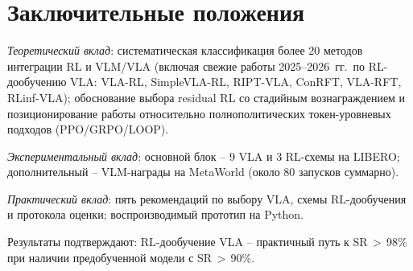 \section*{Заключительные положения}

    \textit{Теоретический вклад}: систематическая классификация более 20 методов интеграции RL и VLM/VLA (включая свежие работы 2025--2026~гг.\ по RL-дообучению VLA: VLA-RL, SimpleVLA-RL, RIPT-VLA, ConRFT, VLA-RFT, RLinf-VLA); обоснование выбора residual RL со стадийным вознаграждением и позиционирование работы относительно полнополитических токен-уровневых подходов (PPO/GRPO/LOOP).

    \textit{Экспериментальный вклад}: основной блок -- 9 VLA и 3 RL-схемы на LIBERO; дополнительный -- VLM-награды на MetaWorld (около 80 запусков суммарно).

    \textit{Практический вклад}: пять рекомендаций по выбору VLA, схемы RL-дообучения и протокола оценки; воспроизводимый прототип на Python.

    Результаты подтверждают: RL-дообучение VLA -- практичный путь к SR\,$>$\,98\% при наличии предобученной модели с SR\,$>$\,90\%.

\endinput
